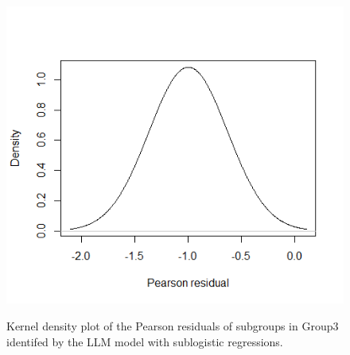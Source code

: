 \documentclass[11pt,onside,a4paper,fleqn]{report}
\begin{document}
\begin{figure}[htbp]
{      \includegraphics[scale=0.25]{figures/group3_3.png}\label{sublogisGroup3Subgroup3}
      }
      \caption{\small{Kernel density plot of the Pearson residuals of subgroups in Group3 identifed by the LLM model with sublogistic regressions.}}
      \end{figure}
\end{document}
